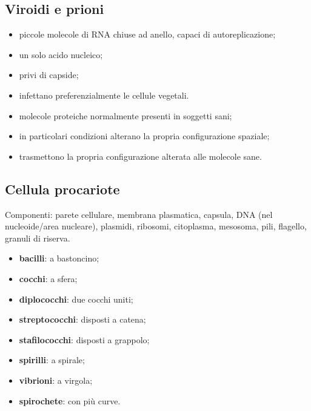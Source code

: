 \subsection{Viroidi e prioni}

\begin{itemize}
  \item piccole molecole di RNA chiuse ad anello, capaci di autoreplicazione;
  \item un solo acido nucleico;
  \item privi di capside;
  \item infettano preferenzialmente le cellule vegetali.
\end{itemize}

\begin{itemize}
  \item molecole proteiche normalmente presenti in soggetti sani;
  \item in particolari condizioni alterano la propria configurazione spaziale;
  \item trasmettono la propria configurazione alterata alle molecole sane.
\end{itemize}

\subsection{Cellula procariote}

Componenti: parete cellulare, membrana plasmatica, capsula, DNA (nel nucleoide/area nucleare), plasmidi, ribosomi, citoplasma, mesosoma, pili, flagello, granuli di riserva.

\begin{itemize}
  \item \textbf{bacilli}: a bastoncino;
  \item \textbf{cocchi}: a sfera;
  \item \textbf{diplococchi}: due cocchi uniti;
  \item \textbf{streptococchi}: disposti a catena;
  \item \textbf{stafilococchi}: disposti a grappolo;
  \item \textbf{spirilli}: a spirale;
  \item \textbf{vibrioni}: a virgola;
  \item \textbf{spirochete}: con più curve.
\end{itemize}

